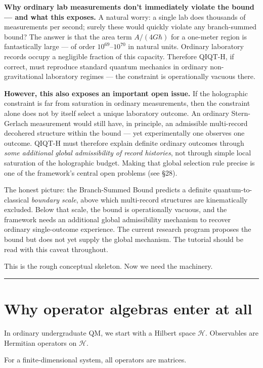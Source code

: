 \documentclass[11pt,a4paper]{article}
\begin{document}
\textbf{Why ordinary lab measurements don't immediately violate the bound — and what this exposes.} A natural worry: a single lab does thousands of measurements per second; surely these would quickly violate any branch-summed bound? The answer is that the area term $A/(4G\hbar)$ for a one-meter region is fantastically large — of order $10^{69}$–$10^{70}$ in natural units. Ordinary laboratory records occupy a negligible fraction of this capacity. Therefore QIQT-H, if correct, must reproduce standard quantum mechanics in ordinary non-gravitational laboratory regimes — the constraint is operationally vacuous there.

\textbf{However, this also exposes an important open issue.} If the holographic constraint is far from saturation in ordinary measurements, then the constraint alone does not by itself select a unique laboratory outcome. An ordinary Stern-Gerlach measurement would still have, in principle, an admissible multi-record decohered structure within the bound — yet experimentally one observes one outcome. QIQT-H must therefore explain definite ordinary outcomes through \emph{some additional global admissibility of record histories}, not through simple local saturation of the holographic budget. Making that global selection rule precise is one of the framework's central open problems (see §28).

The honest picture: the Branch-Summed Bound predicts a definite quantum-to-classical \emph{boundary scale}, above which multi-record structures are kinematically excluded. Below that scale, the bound is operationally vacuous, and the framework needs an additional global admissibility mechanism to recover ordinary single-outcome experience. The current research program proposes the bound but does not yet supply the global mechanism. The tutorial should be read with this caveat throughout.

This is the rough conceptual skeleton. Now we need the machinery.

\medskip\hrule\medskip

\section{Why operator algebras enter at all}

In ordinary undergraduate QM, we start with a Hilbert space $\mathcal{H}$. Observables are Hermitian operators on $\mathcal{H}$.

For a finite-dimensional system, all operators are matrices.
\end{document}
